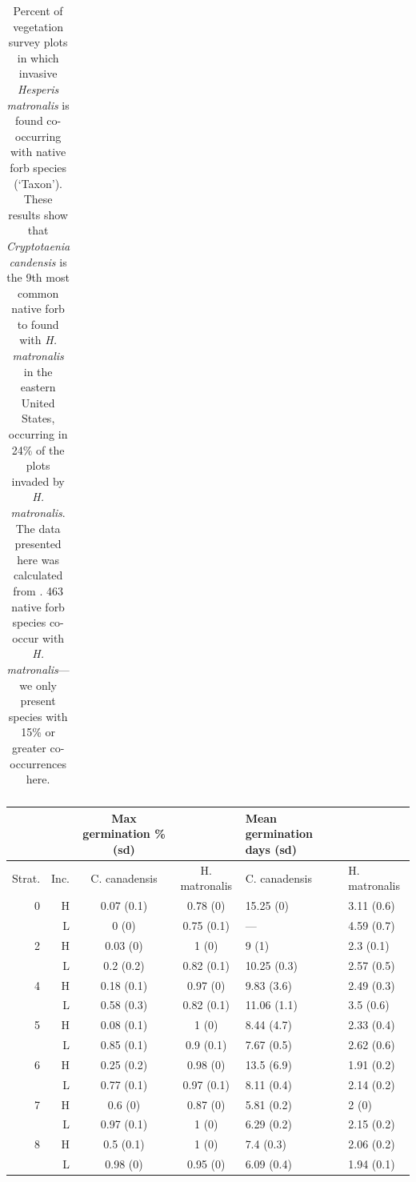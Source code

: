 \documentclass{article}[11pt]
\begin{document}
\begin{table}[hp]
\begin{tabular}{|r|l|c|}
   \hline
\end{tabular}
\caption{Percent of vegetation survey plots in which invasive \emph{Hesperis matronalis} is found co-occurring with native forb species (`Taxon'). These results show that \emph{Cryptotaenia candensis} is the 9th most common native forb to found with \emph{H. matronalis} in the eastern United States, occurring in 24\% of the plots invaded by \emph{H. matronalis}. The data presented here was calculated from \citet{Petri:2022tp}. 463 native forb species co-occur with  \emph{H. matronalis}---we only present species with 15\% or greater co-occurrences here. } 
\label{tab:occoverlap}
\end{table}


\begin{table}[hp]
\centering
\begin{tabular}{|rr|cc|ll|}
   \hline
     & & Max germination \% (sd) & &
   Mean germination days (sd) & \\ 
  \hline
  Strat. & Inc.  & C. canadensis & H. matronalis & C. canadensis & H. matronalis \\ 
  \hline
0 & H & 0.07 (0.1) & 0.78 (0) & 15.25 (0) & 3.11 (0.6) \\ 
  & L & 0 (0) & 0.75 (0.1) & --- & 4.59 (0.7) \\ 
   \hline
 2 & H & 0.03 (0) & 1 (0) & 9 (1) & 2.3 (0.1) \\ 
  & L & 0.2 (0.2) & 0.82 (0.1) & 10.25 (0.3) & 2.57 (0.5) \\ 
   \hline
 4 & H & 0.18 (0.1) & 0.97 (0) & 9.83 (3.6) & 2.49 (0.3) \\ 
 & L & 0.58 (0.3) & 0.82 (0.1) & 11.06 (1.1) & 3.5 (0.6) \\ 
    \hline
    5 & H & 0.08 (0.1) & 1 (0) & 8.44 (4.7) & 2.33 (0.4) \\ 
 & L & 0.85 (0.1) & 0.9 (0.1) & 7.67 (0.5) & 2.62 (0.6) \\ 
   \hline
   6 & H & 0.25 (0.2) & 0.98 (0) & 13.5 (6.9) & 1.91 (0.2) \\ 
  & L & 0.77 (0.1) & 0.97 (0.1) & 8.11 (0.4) & 2.14 (0.2) \\ 
    \hline
    7 & H & 0.6 (0) & 0.87 (0) & 5.81 (0.2) & 2 (0) \\ 
 & L & 0.97 (0.1) & 1 (0) & 6.29 (0.2) & 2.15 (0.2) \\ 
    \hline
    8 & H & 0.5 (0.1) & 1 (0) & 7.4 (0.3) & 2.06 (0.2) \\ 
 & L & 0.98 (0) & 0.95 (0) & 6.09 (0.4) & 1.94 (0.1) \\ 

\end{tabular}
\end{table}
\end{document}
